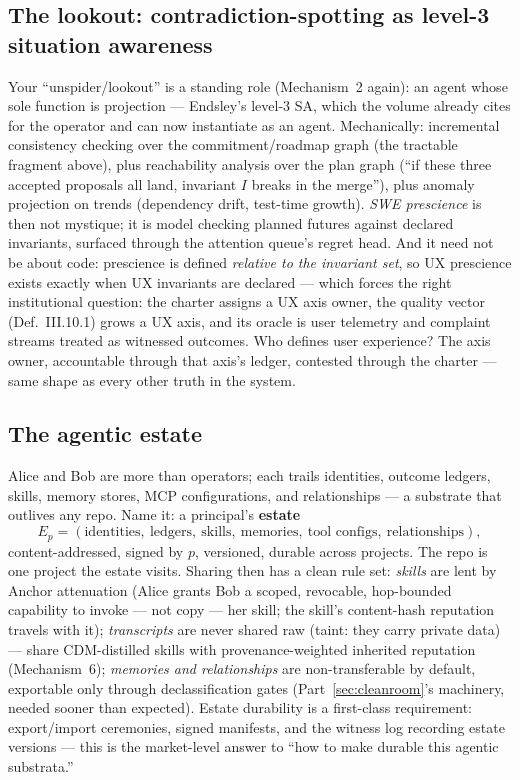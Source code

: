 \documentclass[11pt,a4paper]{article}
\theoremstyle{definition}
\theoremstyle{remark}
\begin{document}
\subsection{The lookout: contradiction-spotting as level-3 situation awareness}
Your ``unspider/lookout'' is a standing role (Mechanism~2 again): an agent whose sole function is projection --- Endsley's level-3 SA, which the volume already cites for the operator and can now instantiate as an agent. Mechanically: incremental consistency checking over the commitment/roadmap graph (the tractable fragment above), plus reachability analysis over the plan graph (``if these three accepted proposals all land, invariant $I$ breaks in the merge''), plus anomaly projection on trends (dependency drift, test-time growth). \emph{SWE prescience} is then not mystique; it is model checking planned futures against declared invariants, surfaced through the attention queue's regret head. And it need not be about code: prescience is defined \emph{relative to the invariant set}, so UX prescience exists exactly when UX invariants are declared --- which forces the right institutional question: the charter assigns a UX axis owner, the quality vector (Def.~III.10.1) grows a UX axis, and its oracle is user telemetry and complaint streams treated as witnessed outcomes. Who defines user experience? The axis owner, accountable through that axis's ledger, contested through the charter --- same shape as every other truth in the system.

\subsection{The agentic estate}
Alice and Bob are more than operators; each trails identities, outcome ledgers, skills, memory stores, MCP configurations, and relationships --- a substrate that outlives any repo. Name it: a principal's \textbf{estate}
\[ E_p = (\text{identities},\ \text{ledgers},\ \text{skills},\ \text{memories},\ \text{tool configs},\ \text{relationships}), \]
content-addressed, signed by $p$, versioned, durable across projects. The repo is one project the estate visits. Sharing then has a clean rule set: \emph{skills} are lent by Anchor attenuation (Alice grants Bob a scoped, revocable, hop-bounded capability to invoke --- not copy --- her skill; the skill's content-hash reputation travels with it); \emph{transcripts} are never shared raw (taint: they carry private data) --- share CDM-distilled skills with provenance-weighted inherited reputation (Mechanism~6); \emph{memories and relationships} are non-transferable by default, exportable only through declassification gates (Part~\ref{sec:cleanroom}'s machinery, needed sooner than expected). Estate durability is a first-class requirement: export/import ceremonies, signed manifests, and the witness log recording estate versions --- this is the market-level answer to ``how to make durable this agentic substrata.''
\end{document}
